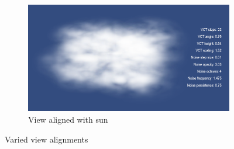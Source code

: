 \begin{figure}[H]
\centering
	\begin{subfigure}[t]{0.48\textwidth}
	\includegraphics[width=\textwidth]{../res/res3.png}
	\caption{View aligned with sun}
	\end{subfigure}
\caption{Varied view alignments}
\end{figure}

